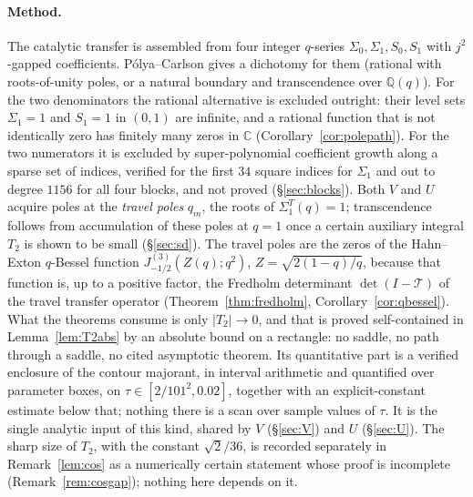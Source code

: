 \documentclass[11pt]{article}
\theoremstyle{plain}
\theoremstyle{definition}
\theoremstyle{remark}
\newcommand{\Q}{\mathbb{Q}}
\newcommand{\C}{\mathbb{C}}
\begin{document}
\paragraph{Method.} The catalytic transfer is assembled from four integer $q$-series
$\Sigma_0,\Sigma_1,S_0,S_1$ with $j^2$-gapped coefficients. P\'olya--Carlson gives a dichotomy for
them (rational with roots-of-unity poles, or a natural boundary and transcendence over $\Q(q)$).
For the two denominators the rational alternative is excluded outright: their level sets
$\Sigma_1=1$ and $S_1=1$ in $(0,1)$ are infinite, and a rational function that is not identically
zero has finitely many zeros in $\C$ (Corollary~\ref{cor:polepath}). For the two numerators it is
excluded by super-polynomial coefficient growth along a sparse set of
indices, verified for the first $34$ square indices for $\Sigma_1$ and out to degree $1156$ for all
four blocks, and not proved (\S\ref{sec:blocks}).
Both $V$ and $U$ acquire poles at the \emph{travel poles} $q_m$, the roots of
$\Sigma_1^T(q)=1$; transcendence follows from accumulation of these poles at $q=1$ once a certain
auxiliary integral $T_2$ is shown to be small (\S\ref{sec:sd}). The travel poles are the zeros of
the Hahn--Exton $q$-Bessel function $J^{(3)}_{-1/2}(Z(q);q^2)$, $Z=\sqrt{2(1-q)/q}$, because that
function is, up to a positive factor, the Fredholm determinant $\det(I-\mathcal T)$ of the travel
transfer operator (Theorem~\ref{thm:fredholm}, Corollary~\ref{cor:qbessel}). What the theorems consume is only
$|T_2|\to0$, and that is proved self-contained in Lemma~\ref{lem:T2abs} by an absolute bound on a
rectangle: no saddle, no path through a saddle, no cited asymptotic theorem. Its quantitative part
is a verified enclosure of the contour majorant, in interval arithmetic and quantified over
parameter boxes, on $\tau\in[2/101^2,0.02]$, together with an explicit-constant estimate below
that; nothing there is a scan over sample values of $\tau$. It is the single
analytic input of this kind, shared by $V$ (\S\ref{sec:V}) and $U$ (\S\ref{sec:U}). The sharp size
of $T_2$, with the constant $\sqrt2/36$, is recorded separately in Remark~\ref{lem:cos} as a
numerically certain statement whose proof is incomplete (Remark~\ref{rem:cosgap}); nothing here
depends on it.
\end{document}

